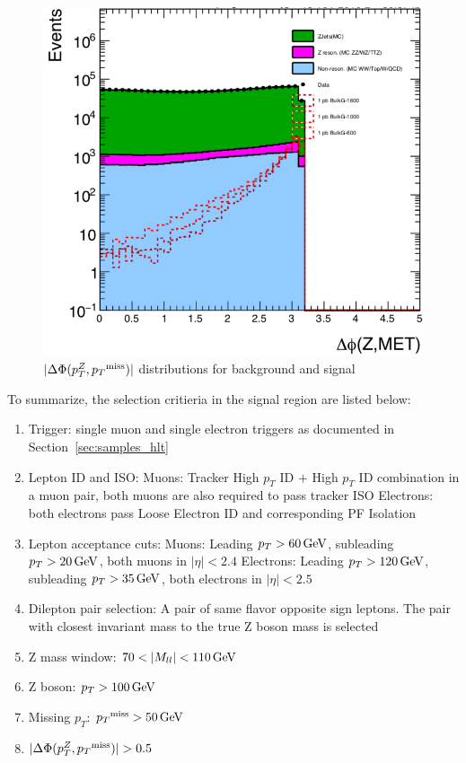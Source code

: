 \begin{figure}[htbp]
\begin{center}
\includegraphics[width=0.75\linewidth]{figures/sel_deltaPhi_ZMET.png}
\caption{$|\Delta \Phi (p_T ^Z ,{p_T}^\text{miss})|$ distributions for background and signal}
\label{fig:sel_deltphi}
\end{center}
\end{figure}


\vspace{0.3cm}
To summarize, the selection critieria in the signal region are listed below:
\begin{enumerate}
\item Trigger: single muon and single electron triggers as documented in Section~\ref{sec:samples_hlt}
\item Lepton ID and ISO:
  \subitem Muons: Tracker High $p_T$ ID $+$ High $p_T$ ID combination in a muon pair, 
  both muons are also required to pass tracker ISO
  \subitem Electrons: both electrons pass Loose Electron ID and corresponding PF Isolation
\item Lepton acceptance cuts:
  \subitem Muons: Leading  $p_T > 60\,\text{Ge\hspace{-.08em}V}$, subleading $p_T > 20\,\text{Ge\hspace{-.08em}V}$, both muons in $|\eta| < 2.4$
  \subitem Electrons: Leading $p_T >120\,\text{Ge\hspace{-.08em}V}$, subleading $p_T >35\,\text{Ge\hspace{-.08em}V}$, both electrons in $|\eta|<2.5$
\item Dilepton pair selection: A pair of same flavor opposite sign
  leptons. The pair with closest invariant mass to the true Z boson mass is selected
\item Z mass window:   $70 < |M_{ll}| < 110\,\text{Ge\hspace{-.08em}V}$
\item Z boson: $p_T >100\,\text{Ge\hspace{-.08em}V}$
\item Missing $p_T$: ${p_T}^\text{miss} > 50\,\text{Ge\hspace{-.08em}V}$
\item $|\Delta \Phi (p_T ^Z ,\ptmiss)|>0.5$
\end{enumerate}

